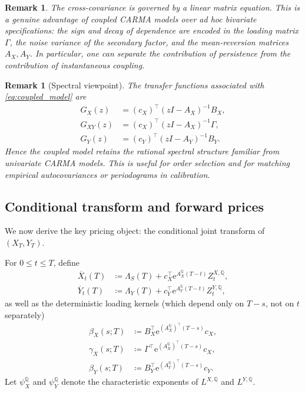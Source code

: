 \documentclass[10pt,a4paper,reqno]{amsart}
\newtheorem{remark}[theorem]{Remark}
\newcommand{\Q}{\mathbb{Q}}
\newcommand{\1}{\mathbbm{1}}
\newcommand{\ee}{\mathrm{e}}
\begin{document}
\begin{remark}
The cross-covariance is governed by a linear matrix equation. This is a genuine
advantage of coupled CARMA models over ad hoc bivariate specifications: the sign
and decay of dependence are encoded in the loading matrix \(\Gamma\), the noise
variance of the secondary factor, and the mean-reversion matrices
\(A_X, A_Y\). In particular, one can separate the contribution of persistence
from the contribution of instantaneous coupling.
\end{remark}

\begin{remark}[Spectral viewpoint]
The transfer functions associated with \eqref{eq:coupled_model} are
\begin{align*}
  G_X(z) &= (c_X)^\top (zI-A_X)^{-1} B_X,\\
  G_{XY}(z) &= (c_X)^\top (zI-A_X)^{-1} \Gamma,\\
  G_Y(z) &= (c_Y)^\top (zI-A_Y)^{-1} B_Y.
\end{align*}
Hence the coupled model retains the rational spectral structure familiar from
univariate CARMA models. This is useful for order selection and for matching
empirical autocovariances or periodograms in calibration.
\end{remark}

\subsection{Conditional transform and forward prices}

We now derive the key pricing object: the conditional joint transform of
\((X_T,Y_T)\).

For \(0 \le t \le T\), define
\begin{align*}
  \overline{X}_t(T)
    &\coloneqq \Lambda_S(T)
      + c_X^\top \ee^{A_X^\Q (T-t)} Z_t^{X,\Q},\\
  \overline{Y}_t(T)
    &\coloneqq \Lambda_Y(T)
      + c_Y^\top \ee^{A_Y^\Q (T-t)} Z_t^{Y,\Q},
\end{align*}
as well as the deterministic loading kernels (which depend only on \(T-s\),
not on \(t\) separately)
\begin{align}
  \beta_X(s;T)
    &\coloneqq B_X^\top \ee^{(A_X^\Q)^\top (T-s)} c_X,
    \label{eq:betaX}\\
  \gamma_X(s;T)
    &\coloneqq \Gamma^\top \ee^{(A_X^\Q)^\top (T-s)} c_X,
    \label{eq:gammaX}\\
  \beta_Y(s;T)
    &\coloneqq B_Y^\top \ee^{(A_Y^\Q)^\top (T-s)} c_Y.
    \label{eq:betaY}
\end{align}
Let \(\psi_X^\Q\) and \(\psi_Y^\Q\) denote the characteristic exponents of
\(L^{X,\Q}\) and \(L^{Y,\Q}\).
\end{document}
